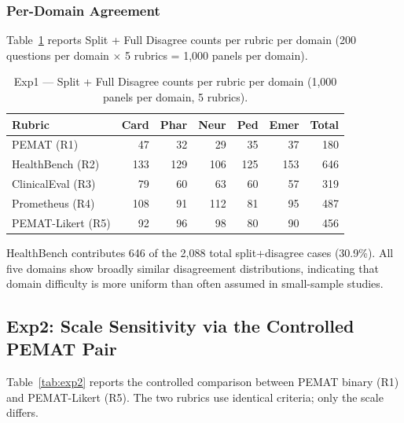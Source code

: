 \documentclass[conference]{IEEEtran}
\begin{document}
\subsubsection{Per-Domain Agreement}

Table~\ref{tab:exp1_detail} reports Split + Full Disagree counts per
rubric per domain (200 questions per domain $\times$ 5 rubrics =
1,000 panels per domain).

\begin{table}[htbp]
\caption{Exp1 --- Split + Full Disagree counts per rubric per domain
(1,000 panels per domain, 5 rubrics).}
\label{tab:exp1_detail}
\begin{flushleft}
\small
\setlength{\tabcolsep}{4pt}
\begin{tabular}{|l|r|r|r|r|r|r|}
\hline
\textbf{Rubric} & \textbf{Card} & \textbf{Phar} & \textbf{Neur} & \textbf{Ped} & \textbf{Emer} & \textbf{Total} \\
\hline
PEMAT (R1)        &  47 &  32 &  29 &  35 &  37 & 180 \\
HealthBench (R2)  & 133 & 129 & 106 & 125 & 153 & 646 \\
ClinicalEval (R3) &  79 &  60 &  63 &  60 &  57 & 319 \\
Prometheus (R4)   & 108 &  91 & 112 &  81 &  95 & 487 \\
PEMAT-Likert (R5) &  92 &  96 &  98 &  80 &  90 & 456 \\
\hline
\end{tabular}
\end{flushleft}
\end{table}

HealthBench contributes 646 of the 2,088 total split+disagree cases
(30.9\%). All five domains show broadly similar disagreement
distributions, indicating that domain difficulty is more uniform than
often assumed in small-sample studies.

\subsection{Exp2: Scale Sensitivity via the Controlled PEMAT Pair}

Table~\ref{tab:exp2} reports the controlled comparison between PEMAT
binary (R1) and PEMAT-Likert (R5). The two rubrics use identical
criteria; only the scale differs.
\end{document}
